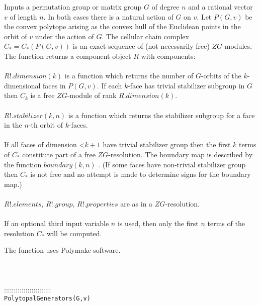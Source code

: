 \documentclass[a4paper,11pt]{report}
\begin{document}
{ Inputs a permutation group or matrix group $G$ of degree $n$ and a rational vector $v$ of length $n$. In both cases there is a natural action of $G$ on $v$. Let $P(G,v)$ be the convex polytope arising as the convex hull of the Euclidean points in
the orbit of $v$ under the action of $G$. The cellular chain complex $C_*=C_*(P(G,v))$ is an exact sequence of (not necessarily free) $ZG$-modules. The function returns a component object $R$ with components: \\
 \\
 $R!.dimension(k)$ is a function which returns the number of $G$-orbits of the $k$-dimensional faces in $P(G,v)$. If each $k$-face has trivial stabilizer subgroup in $G$ then $C_k$ is a free $ZG$-module of rank $R.dimension(k)$. \\
 \\
 $R!.stabilizer(k,n)$ is a function which returns the stabilizer subgroup for a face in the $n$-th orbit of $k$-faces. \\
 \\
 If all faces of dimension {\textless}$k+1$ have trivial stabilizer group then the first $k$ terms of $C_*$ constitute part of a free $ZG$-resolution. The boundary map is described by the function $boundary(k,n)$ . (If some faces have non-trivial stabilizer group then $C_*$ is not free and no attempt is made to determine signs for the boundary map.) \\
 \\
 $R!.elements$, $R!.group$, $R!.properties$ are as in a $ZG$-resolution. \\
 \\
 If an optional third input variable $n$ is used, then only the first $n$ terms of the resolution $C_*$ will be computed. 

 The function uses Polymake software. \\
 \\
 \\
 \\
 ::::::::::::::::::::::::\\
 \texttt{PolytopalGenerators(G,v) }\\
 

}
\end{document}
